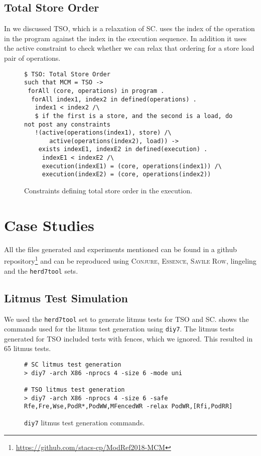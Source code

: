\documentclass[runningheads]{llncs}
\newcommand{\essence}[0]{\textsc{Essence}}
\newcommand{\conjure}{\textsc{Conjure}\xspace}
\newcommand{\savilerow}{\textsc{Savile Row}\xspace}
\begin{document}
\subsection{Total Store Order}
In  we discussed TSO, which is a relaxation of SC.
 uses the index of the operation in the program against the index in the execution sequence.
In addition it uses the active constraint to check whether we can relax that ordering for a store load pair of operations.

\begin{figure}
\begin{lstlisting}
$ TSO: Total Store Order
such that MCM = TSO ->
 forAll (core, operations) in program .
  forAll index1, index2 in defined(operations) .
   index1 < index2 /\
   $ if the first is a store, and the second is a load, do not post any constraints
   !(active(operations(index1), store) /\
       active(operations(index2), load)) ->
    exists indexE1, indexE2 in defined(execution) .
     indexE1 < indexE2 /\
     execution(indexE1) = (core, operations(index1)) /\
     execution(indexE2) = (core, operations(index2))
\end{lstlisting}
\caption{Constraints defining total store order in the execution.\label{fig:essenceTSO}}
\end{figure}



\section{Case Studies}
\label{sec:appl}
All the files generated and experiments mentioned can be found in a github repository\footnote{\url{https://github.com/stacs-cp/ModRef2018-MCM}} and can be reproduced using \conjure{}, \essence{}, \savilerow{}, lingeling and the {\tt{herd7tool}} sets.

\subsection{Litmus Test Simulation}
We used the {\tt{herd7tool}} set \cite{alglave2014} to generate litmus tests for TSO and SC.
\Cref{fig:herd} shows the commands used for the litmus test generation using {\tt{diy7}}.
The litmus tests generated for TSO included tests with fences, which we ignored.
This resulted in 65 litmus tests.
\begin{figure}
\begin{lstlisting}
# SC litmus test generation
> diy7 -arch X86 -nprocs 4 -size 6 -mode uni

# TSO litmus test generation
> diy7 -arch X86 -nprocs 4 -size 6 -safe Rfe,Fre,Wse,PodR*,PodWW,MFencedWR -relax PodWR,[Rfi,PodRR]
\end{lstlisting}
\caption{{\tt{diy7}} litmus test generation commands.\label{fig:herd}}
\end{figure}
\end{document}
